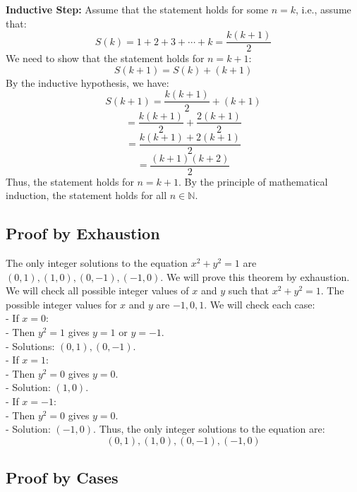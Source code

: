 	\textbf{Inductive Step:} Assume that the statement holds for some \( n = k \), i.e., assume that:
	\[
		S(k) = 1 + 2 + 3 + \cdots + k = \frac{k(k+1)}{2}
	\]
	We need to show that the statement holds for \( n = k + 1 \):
	\[
		S(k+1) = S(k) + (k + 1)
	\]
	By the inductive hypothesis, we have:
	\[
		S(k+1) = \frac{k(k+1)}{2} + (k + 1)
	\]
	\[
		= \frac{k(k+1)}{2} + \frac{2(k + 1)}{2}
	\]
	\[      = \frac{k(k+1) + 2(k + 1)}{2}
	\]
	\[
		= \frac{(k + 1)(k + 2)}{2}
	\]
	Thus, the statement holds for \( n = k + 1 \).
	By the principle of mathematical induction, the statement holds for all \( n \in \mathbb{N} \).

\QED

\subsection{Proof by Exhaustion}

The only integer solutions to the equation \( x^2 + y^2 = 1 \) are \( (0, 1), (1, 0), (0, -1), (-1, 0) \).
\newline
	We will prove this theorem by exhaustion. We will check all possible integer values of \( x \) and \( y \) such that \( x^2 + y^2 = 1 \).
\newline
	The possible integer values for \( x \) and \( y \) are \( -1, 0, 1 \). We will check each case:
	\\
	- If \( x = 0 \):
	\\
	- Then \( y^2 = 1 \) gives \( y = 1 \) or \( y = -1 \).
	\\
	- Solutions: \( (0, 1), (0, -1) \).
	\\
	- If \( x = 1 \):
	\\
	- Then \( y^2 = 0 \) gives \( y = 0 \).
	\\
	- Solution: \( (1, 0) \).
	\\
	- If \( x = -1 \):
	\\
	- Then \( y^2 = 0 \) gives \( y = 0 \).
	\\
	- Solution: \( (-1, 0) \).
\newline
	Thus, the only integer solutions to the equation are:
	\[
		(0, 1), (1, 0), (0, -1), (-1, 0)
	\]

\QED

\subsection{Proof by Cases}

